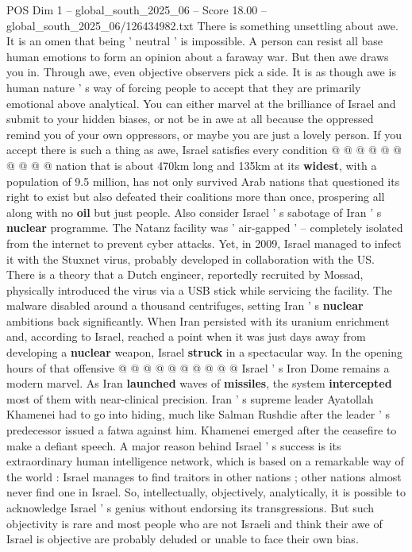 \begin{textsample}{POS Dim 1 – global\_south\_2025\_06 – Score 18.00 – global\_south\_2025\_06/126434982.txt}
There is something unsettling about awe.
It is an omen that being ' neutral ' is impossible.
A person can resist all base human emotions to form an opinion about a faraway war.
But then awe draws you in.
Through awe, even objective observers pick a side.
It is as though awe is human nature ' s way of forcing people to accept that they are primarily emotional above analytical.
You can either marvel at the brilliance of Israel and submit to your hidden biases, or not be in awe at all because the oppressed remind you of your own oppressors, or maybe you are just a lovely person.
If you accept there is such a thing as awe, Israel satisfies every condition @ @ @ @ @ @ @ @ @ @ nation that is about 470km long and 135km at its \textbf{widest}, with a population of 9.5 million, has not only survived Arab nations that questioned its right to exist but also defeated their coalitions more than once, prospering all along with no \textbf{oil} but just people.
Also consider Israel ' s sabotage of Iran ' s \textbf{nuclear} programme.
The Natanz facility was ' air-gapped ' -- completely isolated from the internet to prevent cyber attacks.
Yet, in 2009, Israel managed to infect it with the Stuxnet virus, probably developed in collaboration with the US.
There is a theory that a Dutch engineer, reportedly recruited by Mossad, physically introduced the virus via a USB stick while servicing the facility.
The malware disabled around a thousand centrifuges, setting Iran ' s \textbf{nuclear} ambitions back significantly.
When Iran persisted with its uranium enrichment and, according to Israel, reached a point when it was just days away from developing a \textbf{nuclear} weapon, Israel \textbf{struck} in a spectacular way.
In the opening hours of that offensive @ @ @ @ @ @ @ @ @ @ Israel ' s Iron Dome remains a modern marvel.
As Iran \textbf{launched} waves of \textbf{missiles}, the system \textbf{intercepted} most of them with near-clinical precision.
Iran ' s supreme leader Ayatollah Khamenei had to go into hiding, much like Salman Rushdie after the leader ' s predecessor issued a fatwa against him.
Khamenei emerged after the ceasefire to make a defiant speech.
A major reason behind Israel ' s success is its extraordinary human intelligence network, which is based on a remarkable way of the world : Israel manages to find traitors in other nations ; other nations almost never find one in Israel.
So, intellectually, objectively, analytically, it is possible to acknowledge Israel ' s genius without endorsing its transgressions.
But such objectivity is rare and most people who are not Israeli and think their awe of Israel is objective are probably deluded or unable to face their own bias.

\end{textsample}
